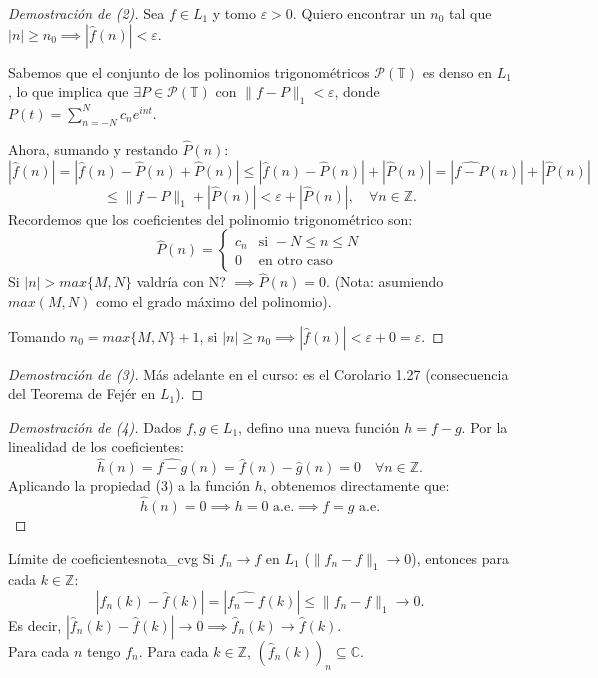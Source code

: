 \begin{proof}[Demostración de (2)]
Sea $f \in L_1$ y tomo $\varepsilon > 0$. Quiero encontrar un $n_0$ tal que $|n| \ge n_0 \implies |\hat{f}(n)| < \varepsilon$. 

Sabemos que el conjunto de los polinomios trigonométricos $\mathcal{P}(\mathbb{T})$ es denso en $L_1$, lo que implica que $\exists P \in \mathcal{P}(\mathbb{T})$ con $\|f - P\|_1 < \varepsilon$, donde $P(t) = \sum_{n=-N}^N c_n e^{i n t}$. 

Ahora, sumando y restando $\hat{P}(n)$:
\[
|\hat{f}(n)| = |\hat{f}(n) - \hat{P}(n) + \hat{P}(n)| \le |\hat{f}(n) - \hat{P}(n)| + |\hat{P}(n)| = |\widehat{f - P}(n)| + |\hat{P}(n)|
\]
\[
\le \|f - P\|_1 + |\hat{P}(n)| < \varepsilon + |\hat{P}(n)|, \quad \forall n \in \mathbb{Z}.
\]
Recordemos que los coeficientes del polinomio trigonométrico son:
\[
\hat{P}(n) = \begin{cases} c_n & \text{si } -N \le n \le N \\ 0 & \text{en otro caso} \end{cases}
\]
Si $|n| > max\{M, N\}$ valdría con N? $ \implies \hat{P}(n) = 0$. (Nota: asumiendo $max(M,N)$ como el grado máximo del polinomio). 

Tomando $n_0 = max\{M, N\} + 1$, si $|n| \ge n_0 \implies |\hat{f}(n)| < \varepsilon + 0 = \varepsilon$.
\end{proof}

\begin{proof}[Demostración de (3)]
Más adelante en el curso: es el Corolario 1.27 (consecuencia del Teorema de Fejér en $L_1$).
\end{proof}

\begin{proof}[Demostración de (4)]
Dados $f, g \in L_1$, defino una nueva función $h = f - g$. Por la linealidad de los coeficientes:
\[
\hat{h}(n) = \widehat{f - g}(n) = \hat{f}(n) - \hat{g}(n) = 0 \quad \forall n \in \mathbb{Z}.
\]
Aplicando la propiedad (3) a la función $h$, obtenemos directamente que:
\[
\hat{h}(n) = 0 \implies h = 0 \text{ a.e.} \implies f = g \text{ a.e.}
\]
\end{proof}

\begin{nota}{Límite de coeficientes}{nota_cvg}
Si $f_n \to f$ en $L_1$ ($\|f_n - f\|_1 \to 0$), entonces para cada $k \in \mathbb{Z}$:
\[
|\hat{f}_n(k) - \hat{f}(k)| = |\widehat{f_n - f}(k)| \le \|f_n - f\|_1 \to 0.
\]
Es decir, $|\hat{f}_n(k) - \hat{f}(k)| \to 0 \implies \hat{f}_n(k) \to \hat{f}(k)$. \\
Para cada $n$ tengo $f_n$. Para cada $k \in \mathbb{Z}$, $(\hat{f}_n(k))_n \subseteq \mathbb{C}$.
\end{nota}

